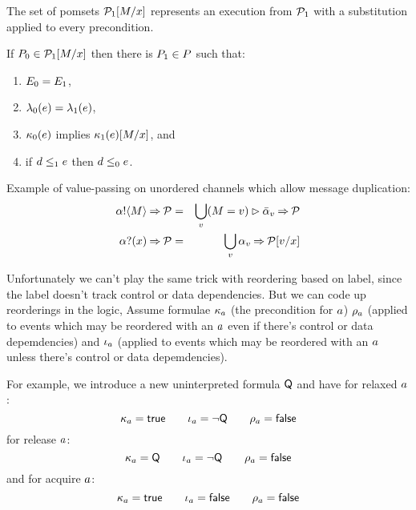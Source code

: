 The set of pomsets $\mathcal{P}_1[M/x]$ represents an execution from $\mathcal{P}_1$ with a substitution
applied to every precondition.
\begin{definition}
  \label{defn:pomset-subst}
  If $P_0 \in \mathcal{P}_1[M/x]$ then there is $P_1\in P$ such that:
  \begin{enumerate}
  \item $E_0 = E_1$,
  \item $\lambda_0(e) = \lambda_1(e)$,
  \item $\kappa_0(e)$ implies $\kappa_1(e)[M/x]$, and
  \item if $d\le_1e$ then $d\le_0e$.
  \end{enumerate}
\end{definition}

Example of value-passing on unordered channels which allow
message duplication:
\begin{eqnarray*}
  \sSEND\aChan\aExp\sPREFIX\aPSS & = &
  \bigcup_\aVal (\aExp=\aVal) \sGUARD \send\aChan{\aVal} \sPREFIX \aPSS
\\
  \sRECV\aChan\aVar\sPREFIX\aPSS & = &
  \bigcup_\aVal \recv\aChan{\aVal} \sPREFIX \aPSS[\aVal/\aVar]
\end{eqnarray*}

Unfortunately we can't play the same trick with reordering based on
label, since the label doesn't track control or data dependencies. But
we can code up reorderings in the logic, Assume formulae
$\kappa_a$ (the precondition for $a$)
$\rho_a$ (applied to events which may be reordered with
an $a$ even if there's control or data depemdencies) and
$\iota_a$ (applied to events which may be reordered with
an $a$ unless there's control or data depemdencies).

For example, we introduce a new uninterpreted formula $\mathsf{Q}$
and have for relaxed $a$:
\[
  \kappa_{a} = \mathsf{true}
\qquad
  \iota_{a} = \neg\mathsf{Q}
\qquad
  \rho_{a} = \mathsf{false}
\]
for release $a$:
\[
  \kappa_{a} = \mathsf{Q}
\qquad
  \iota_{a} = \neg\mathsf{Q}
\qquad
  \rho_{a} = \mathsf{false}
\]
and for acquire $a$:
\[
  \kappa_{a} = \mathsf{true}
\qquad
  \iota_{a} = \mathsf{false}
\qquad
  \rho_{a} = \mathsf{false}
\]


